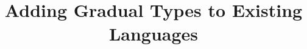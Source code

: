 \documentclass[runningheads]{llncs}
\begin{document}
	
\title{Adding Gradual Types to Existing Languages}
\maketitle








\end{document}
